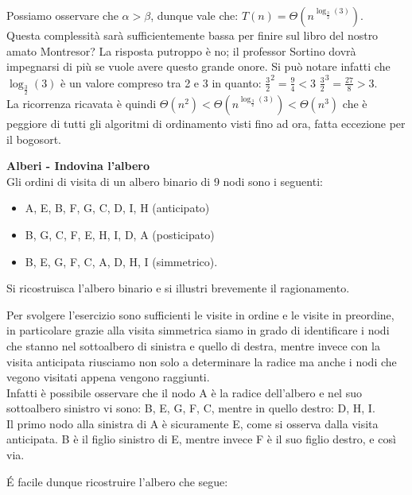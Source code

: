\documentclass[../cheatSheetAlgoritmi.tex]{subfiles}
\begin{document}
Possiamo osservare che $\alpha > \beta$, dunque vale che: $T(n) = \Theta(n^{\log_{\frac{3}{2}}(3)})$. \\ Questa complessità sarà sufficientemente bassa per finire sul libro del nostro amato Montresor? La risposta putroppo è no; il professor Sortino dovrà impegnarsi di più se vuole avere questo grande onore. Si può notare infatti che $\log_{\frac{3}{2}}(3)$ è un valore compreso tra 2 e 3 in quanto: $\frac{3}{2}^2 = \frac{9}{4} < 3$ $\frac{3}{2}^3 = \frac{27}{8} >3 $. \\ La ricorrenza ricavata è quindi $\Theta(n^2) < \Theta(n^{\log_{\frac{3}{2}}(3)}) < \Theta(n^3)$ che è peggiore di tutti gli algoritmi di ordinamento visti fino ad ora, fatta eccezione per il bogosort.
 
\textbf{Alberi - Indovina l'albero}\\
Gli ordini di visita di un albero binario di 9 nodi sono i seguenti:

\begin{itemize}
	\item A, E, B, F, G, C, D, I, H (anticipato)
	\item B, G, C, F, E, H, I, D, A (posticipato)
	\item B, E, G, F, C, A, D, H, I (simmetrico).
\end{itemize}

Si ricostruisca l’albero binario e si illustri brevemente il ragionamento.

\bigskip
Per svolgere l'esercizio sono sufficienti le visite in ordine e le visite in preordine, in particolare grazie alla visita simmetrica siamo in grado di identificare i nodi che stanno nel sottoalbero di sinistra e quello di destra, mentre invece con la visita anticipata riusciamo non solo a determinare la radice ma anche i nodi che vegono visitati appena vengono raggiunti.\\
Infatti è possibile osservare che il nodo A è la radice dell'albero e nel suo sottoalbero sinistro vi sono: B, E, G, F, C, mentre in quello destro: D, H, I. \\
Il primo nodo alla sinistra di A è sicuramente E, come si osserva dalla visita anticipata. B è il figlio sinistro di E, mentre invece F è il suo figlio destro, e così via.

É facile dunque ricostruire l'albero che segue:

\begin{center}
\end{center}
\end{document}
